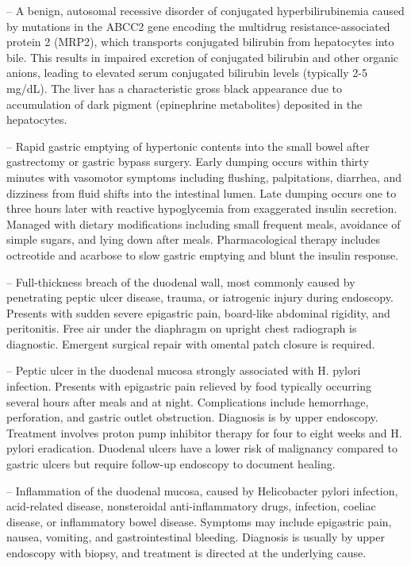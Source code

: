 -- A benign, autosomal recessive disorder of conjugated hyperbilirubinemia caused by mutations in the ABCC2 gene encoding the multidrug resistance-associated protein 2 (MRP2), which transports conjugated bilirubin from hepatocytes into bile. This results in impaired excretion of conjugated bilirubin and other organic anions, leading to elevated serum conjugated bilirubin levels (typically 2-5 mg/dL). The liver has a characteristic gross black appearance due to accumulation of dark pigment (epinephrine metabolites) deposited in the hepatocytes.

-- Rapid gastric emptying of hypertonic contents into the small bowel after gastrectomy or gastric bypass surgery. Early dumping occurs within thirty minutes with vasomotor symptoms including flushing, palpitations, diarrhea, and dizziness from fluid shifts into the intestinal lumen. Late dumping occurs one to three hours later with reactive hypoglycemia from exaggerated insulin secretion. Managed with dietary modifications including small frequent meals, avoidance of simple sugars, and lying down after meals. Pharmacological therapy includes octreotide and acarbose to slow gastric emptying and blunt the insulin response.

-- Full-thickness breach of the duodenal wall, most commonly caused by penetrating peptic ulcer disease, trauma, or iatrogenic injury during endoscopy. Presents with sudden severe epigastric pain, board-like abdominal rigidity, and peritonitis. Free air under the diaphragm on upright chest radiograph is diagnostic. Emergent surgical repair with omental patch closure is required.

-- Peptic ulcer in the duodenal mucosa strongly associated with H. pylori infection. Presents with epigastric pain relieved by food typically occurring several hours after meals and at night. Complications include hemorrhage, perforation, and gastric outlet obstruction. Diagnosis is by upper endoscopy. Treatment involves proton pump inhibitor therapy for four to eight weeks and H. pylori eradication. Duodenal ulcers have a lower risk of malignancy compared to gastric ulcers but require follow-up endoscopy to document healing.

-- Inflammation of the duodenal mucosa, caused by Helicobacter pylori infection, acid-related disease, nonsteroidal anti-inflammatory drugs, infection, coeliac disease, or inflammatory bowel disease. Symptoms may include epigastric pain, nausea, vomiting, and gastrointestinal bleeding. Diagnosis is usually by upper endoscopy with biopsy, and treatment is directed at the underlying cause.


